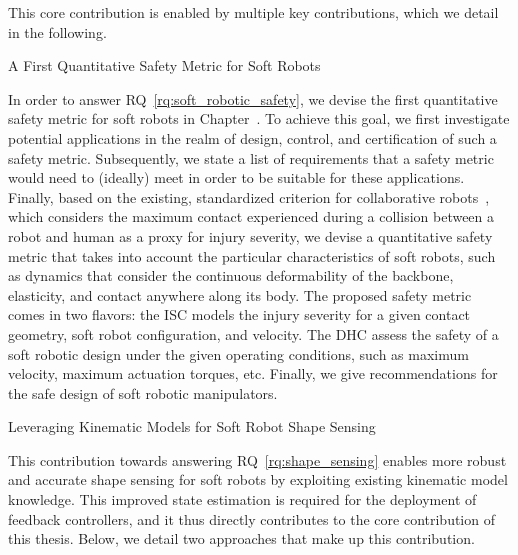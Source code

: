 This core contribution is enabled by multiple key contributions, which we detail in the following.

\begin{contribution}\label{contrib:safety_metric}
    A First Quantitative Safety Metric for Soft Robots
\end{contribution}
In order to answer \gls{RQ}~\ref{rq:soft_robotic_safety}, we devise the first quantitative safety metric for soft robots in Chapter~\circled{\ref{chp:safetymetric}}.
To achieve this goal, we first investigate potential applications in the realm of design, control, and certification of such a safety metric. Subsequently, we state a list of requirements that a safety metric would need to (ideally) meet in order to be suitable for these applications.
Finally, based on the existing, standardized criterion for collaborative robots~\cite{Isots_15066_2016}, which considers the maximum contact experienced during a collision between a robot and human as a proxy for injury severity, we devise a quantitative safety metric that takes into account the particular characteristics of soft robots, such as dynamics that consider the continuous deformability of the backbone, elasticity, and contact anywhere along its body.
The proposed safety metric comes in two flavors: the \gls{ISC} models the injury severity for a given contact geometry, soft robot configuration, and velocity. The \gls{DHC} assess the safety of a soft robotic design under the given operating conditions, such as maximum velocity, maximum actuation torques, etc.
Finally, we give recommendations for the safe design of soft robotic manipulators.

\begin{contribution}\label{contrib:kinematic_models_shape_sensing}
    Leveraging Kinematic Models for Soft Robot Shape Sensing    
\end{contribution}
This contribution towards answering \gls{RQ}~\ref{rq:shape_sensing} enables more robust and accurate shape sensing for soft robots by exploiting existing kinematic model knowledge. This improved state estimation is required for the deployment of feedback controllers, and it thus directly contributes to the core contribution of this thesis.
Below, we detail two approaches that make up this contribution.

